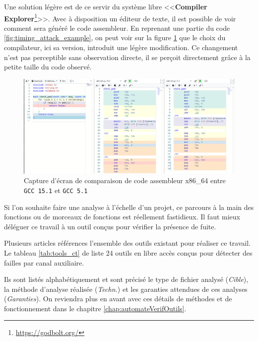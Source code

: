 Une solution légère est de ce servir du système libre <<\textbf{Compiler Explorer}\footnote{\url{https://godbolt.org/}}>>. Avec à disposition un éditeur de texte, il est possible de voir comment sera généré le code assembleur. En reprenant une partie du code \ref{fig:timing_attack_example}, on peut voir sur la figure \ref{img:godbolt_example} que le choix du compilateur, ici sa version, introduit une légère modification. Ce changement n'est pas perceptible sans observation directe, il se perçoit directement grâce à la petite taille du code observé.

\begin{figure}[!h]
  \begin{adjustwidth}{-2.5cm}{-2cm}
    \centering
    \includegraphics[trim = 1mm 0mm 0mm 0mm, clip,width=0.9\paperwidth]{pictures/godbolt_example.png}
    \caption{Capture d'écran de comparaison de code assembleur x86\_64 entre \texttt{GCC 15.1} et \texttt{GCC 5.1}}
    \label{img:godbolt_example}
  \end{adjustwidth}
\end{figure}

Si l'on souhaite faire une analyse à l'échelle d'un projet, ce parcours à la main des fonctions ou de morceaux de fonctions est réellement fastidieux. Il faut mieux déléguer ce travail à un outil conçus pour vérifier la présence de fuite.\smallbreak

Plusieurs articles références l'ensemble des outils existant \cite{notThatHardCT, GeimerEvaluationsSideChannel} pour réaliser ce travail. Le tableau \ref{tab:tools_ct} de \citeauthor{notThatHardCT} liste 24 outils en libre accès conçus pour détecter des failles par canal auxiliaire.

Ils sont listés alphabétiquement et sont précisé le type de fichier analysé (\textit{Cible}), la méthode d'analyse réalisée (\textit{Techn.}) et les garanties attendues de ces analyses (\textit{Garanties}). On reviendra plus en avant avec ces détails de méthodes et de fonctionnement dans le chapitre \ref{chap:automateVerifOutils}.\medbreak

